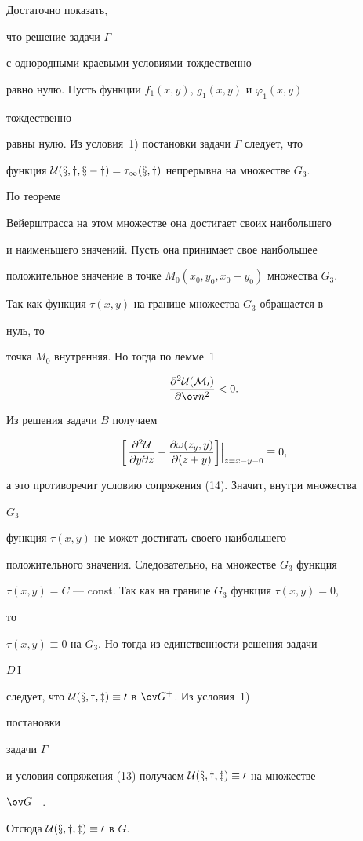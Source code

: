 \begin{pf} Достаточно показать,  


что решение задачи $\Gamma$ 


с однородными краевыми условиями тождественно 


равно нулю. Пусть функции $f_1(x,y)$, $g_1(x,y)$ и $\varphi_1(x,y)$ 


тождественно 


равны нулю. Из условия~1) постановки задачи $\Gamma$ следует, что  


функция $\cal U(x,y,x-y)=\tau_1(x,y)$ непрерывна на множестве $G_3$. 


По теореме 


Вейерштрасса на этом множестве она достигает своих наибольшего 


и наименьшего значений. Пусть она принимает свое наибольшее  


положительное значение в точке $M_0(x_0,y_0,x_0-y_0)$ множества $G_3$. 


Так как функция $\tau(x,y)$ на границе множества $G_3$ обращается в 


нуль, то  


точка $M_0$ внутренняя. Но тогда по лемме~1 


$$ 


\frac{\partial^2\cal U(M_0)}{\partial\ov n^2}<0. 


$$ 


Из решения задачи $B$ получаем 


$$ 


\bigg[\, 


\frac{\partial^2\cal U}{\partial y\partial z}- 


\frac{\partial\omega(z_y,y)}{\partial(z+y)}\bigg] 


\Big|_{z=x-y-0}\equiv0, 


$$ 


а это противоречит условию сопряжения (14). Значит, внутри множества 


$G_3$ 


функция $\tau(x,y)$ не может достигать своего наибольшего  


положительного значения. Следовательно, на множестве $G_3$ функция 


$\tau(x,y)=C$ --- const. Так как на границе $G_3$ функция $\tau(x,y)=0$, 


то  


$\tau(x,y)\equiv0$ на $G_3$. Но тогда из единственности решения задачи 


$D$\,I 


следует, что $\cal U(x,y,z)\equiv0$ в $\ov G^+$. Из условия~1) 


постановки 


задачи $\Gamma$ 


и условия сопряжения (13) получаем $\cal U(x,y,z)\equiv0$ на множестве 


$\ov G\,^-$.  


Отсюда $\cal U(x,y,z)\equiv0$ в $G$. 


\end{pf} 


